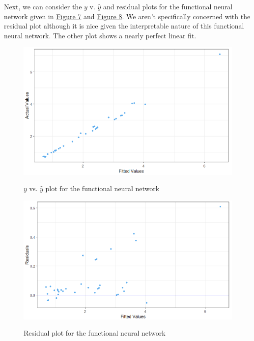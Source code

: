 \documentclass{article}
\begin{document}
\noindent Next, we can consider the $y$ v. $\hat{y}$ and residual plots for the functional neural network given in \hyperref[fig:resPlotss]{Figure 7} and \hyperref[fig:fitted]{Figure 8}. We aren't specifically concerned with the residual plot although it is nice given the interpretable nature of this functional neural network. The other plot shows a nearly perfect linear fit.

\begin{figure}[h!]
  \centering
  \includegraphics[scale = 0.4]{fittedvsactual.png}
  \label{fig:resPlotss}
  \caption{$y$ vs. $\hat{y}$ plot for the functional neural network}
\end{figure}

\begin{figure}[h!]
  \centering
  \includegraphics[scale = 0.4]{resplot2.png}
  \label{fig:fitted}
  \caption{Residual plot for the functional neural network}
\end{figure}
\end{document}
